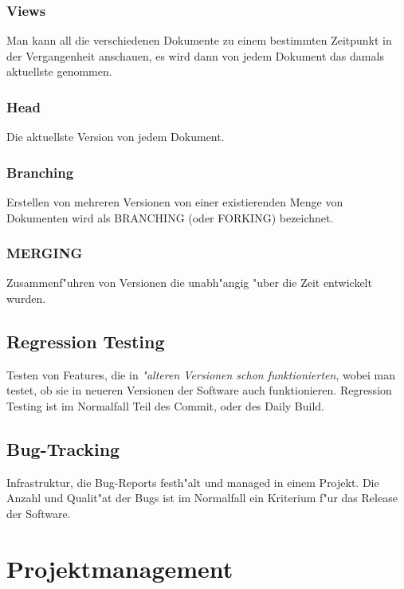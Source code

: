 \documentclass[german, 10pt, a4paper, twocolumn]{scrartcl}
\theoremstyle{definition}
\begin{document}
\subsubsection{Views}

Man kann all die verschiedenen Dokumente zu einem bestimmten Zeitpunkt in der Vergangenheit anschauen, es wird dann von jedem Dokument das damals aktuellste genommen.

\subsubsection{Head}

Die aktuellste Version von jedem Dokument.

\subsubsection{Branching}

Erstellen von mehreren Versionen von einer existierenden Menge von Dokumenten wird als BRANCHING (oder FORKING) bezeichnet.

\subsubsection{MERGING}

Zusammenf"uhren von Versionen die unabh"angig "uber die Zeit entwickelt wurden.


\subsection{Regression Testing}

Testen von Features, die in \textit{"alteren Versionen schon funktionierten}, wobei man testet, ob sie in neueren Versionen der Software auch funktionieren. Regression Testing ist im Normalfall Teil des Commit, oder des Daily Build.


\subsection{Bug-Tracking}

Infrastruktur, die Bug-Reports festh"alt und managed in einem Projekt. Die Anzahl und Qualit"at der Bugs ist im Normalfall ein Kriterium f"ur das Release der Software.

\section{Projektmanagement}
\end{document}
